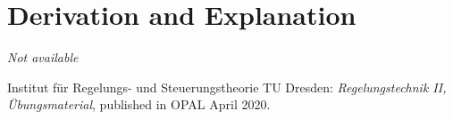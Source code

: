 \documentclass[10pt,a4paper]{article}
\begin{document}

	\section{Derivation and Explanation} %

	\textit{Not available}


	\begin{thebibliography}{10}
		Institut für Regelungs- und Steuerungstheorie TU Dresden:
		\textit{Regelungstechnik II, Übungsmaterial}, published in OPAL April 2020.
	\end{thebibliography}
\end{document}
